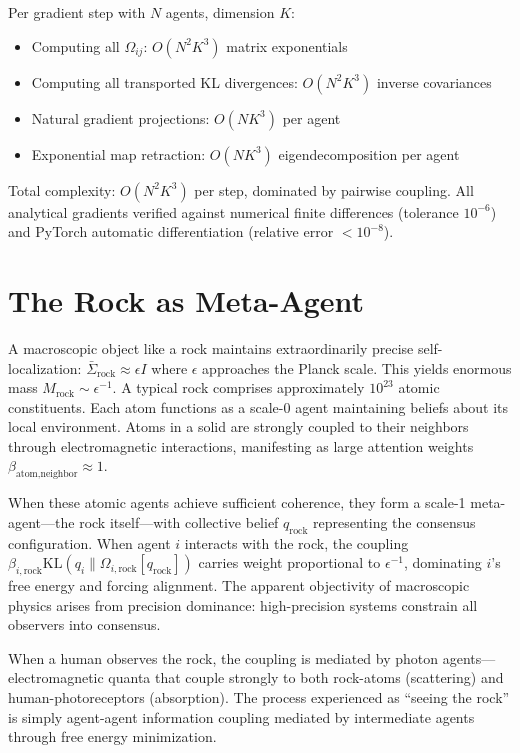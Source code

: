 \documentclass[11pt]{article}
\begin{document}
Per gradient step with $N$ agents, dimension $K$:
\begin{itemize}
\item Computing all $\Omega_{ij}$: $O(N^2 K^3)$ matrix exponentials
\item Computing all transported KL divergences: $O(N^2 K^3)$ inverse covariances
\item Natural gradient projections: $O(NK^3)$ per agent
\item Exponential map retraction: $O(NK^3)$ eigendecomposition per agent
\end{itemize}

Total complexity: $O(N^2 K^3)$ per step, dominated by pairwise coupling. All analytical gradients verified against numerical finite differences (tolerance $10^{-6}$) and PyTorch automatic differentiation (relative error $< 10^{-8}$).

\section{The Rock as Meta-Agent}
\label{app:rock}

A macroscopic object like a rock maintains extraordinarily precise self-localization: $\bar{\Sigma}_{\mathrm{rock}} \approx \epsilon I$ where $\epsilon$ approaches the Planck scale. This yields enormous mass $M_{\mathrm{rock}} \sim \epsilon^{-1}$. A typical rock comprises approximately $10^{23}$ atomic constituents. Each atom functions as a scale-0 agent maintaining beliefs about its local environment. Atoms in a solid are strongly coupled to their neighbors through electromagnetic interactions, manifesting as large attention weights $\beta_{\text{atom,neighbor}} \approx 1$.

When these atomic agents achieve sufficient coherence, they form a scale-1 meta-agent---the rock itself---with collective belief $q_{\text{rock}}$ representing the consensus configuration. When agent $i$ interacts with the rock, the coupling $\beta_{i,\mathrm{rock}}\mathrm{KL}(q_i \| \Omega_{i,\mathrm{rock}}[q_{\mathrm{rock}}])$ carries weight proportional to $\epsilon^{-1}$, dominating $i$'s free energy and forcing alignment. The apparent objectivity of macroscopic physics arises from precision dominance: high-precision systems constrain all observers into consensus.

When a human observes the rock, the coupling is mediated by photon agents---electromagnetic quanta that couple strongly to both rock-atoms (scattering) and human-photoreceptors (absorption). The process experienced as ``seeing the rock'' is simply agent-agent information coupling mediated by intermediate agents through free energy minimization.
\end{document}
